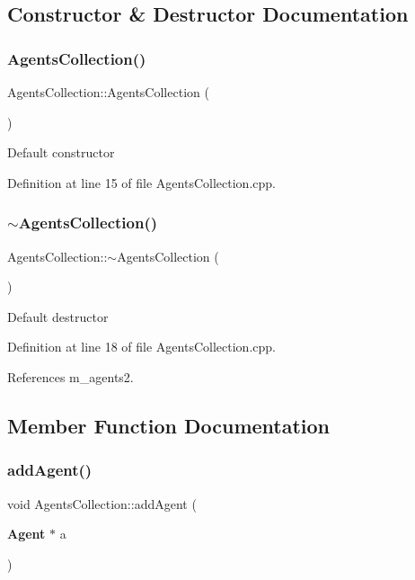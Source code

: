 \subsection{Constructor \& Destructor Documentation}
\mbox{\label{class_agents_collection_a866b0ed56c0109e82bc7c839de0a3267}} 
\subsubsection{AgentsCollection()}
{\footnotesize\ttfamily Agents\+Collection\+::\+Agents\+Collection (\begin{DoxyParamCaption}{ }\end{DoxyParamCaption})}

Default constructor 

Definition at line 15 of file Agents\+Collection.\+cpp.

\mbox{\label{class_agents_collection_a3c7532b5fd174defe41e341c357f47bb}} 
\subsubsection{$\sim$AgentsCollection()}
{\footnotesize\ttfamily Agents\+Collection\+::$\sim$\+Agents\+Collection (\begin{DoxyParamCaption}{ }\end{DoxyParamCaption})\hspace{0.3cm}{\ttfamily [virtual]}}

Default destructor 

Definition at line 18 of file Agents\+Collection.\+cpp.



References m\+\_\+agents2.



\subsection{Member Function Documentation}
\mbox{\label{class_agents_collection_a51d14d0635dedd5971ea90dec4f9e7f3}} 
\subsubsection{addAgent()}
{\footnotesize\ttfamily void Agents\+Collection\+::add\+Agent (\begin{DoxyParamCaption}\item[{\textbf{ Agent} $\ast$}]{a }\end{DoxyParamCaption})}



